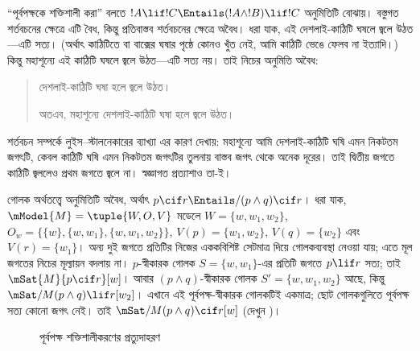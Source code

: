 \documentclass[../../../include/open-logic-section]{subfiles}
\begin{document}


``পূর্বপক্ষকে শক্তিশালী করা'' বলতে
$!A \lif !C \Entails (!A \land !B) \lif !C$ অনুমিতিটি বোঝায়।
বস্তুগত শর্তবচনের ক্ষেত্রে এটি বৈধ, কিন্তু প্রতিবাস্তব
শর্তবচনের ক্ষেত্রে অবৈধ। ধরা যাক, এই দেশলাই-কাঠিটি
ঘষলে জ্বলে উঠত—এটি সত্য। (অর্থাৎ কাঠিটিতে বা বাক্সের
ঘষার পৃষ্ঠে কোনও খুঁত নেই, আমি কাঠিটি ভেঙে ফেলব না
ইত্যাদি।) কিন্তু মহাশূন্যে এই কাঠিটি ঘষলে জ্বলে উঠত—এটি
সত্য নয়। তাই নিচের অনুমিতি অবৈধ:
\begin{quote}
  দেশলাই-কাঠিটি ঘষা হলে জ্বলে উঠত।

  অতএব, মহাশূন্যে দেশলাই-কাঠিটি ঘষা হলে জ্বলে উঠত।
\end{quote}

শর্তবচন সম্পর্কে লুইস--স্টালনেকারের ব্যাখ্যা এর কারণ দেখায়:
মহাশূন্যে আমি দেশলাই-কাঠিটি ঘষি এমন নিকটতম জগৎটি,
কেবল কাঠিটি ঘষি এমন নিকটতম জগৎটির তুলনায় বাস্তব জগৎ
থেকে অনেক দূরের। তাই দ্বিতীয় জগতে কাঠিটি জ্বললেও
প্রথম জগতে জ্বলে না। স্বজ্ঞাগত প্রত্যাশাও তা-ই।

\begin{ex}
  গোলক অর্থতত্ত্বে অনুমিতিটি অবৈধ, অর্থাৎ $p
  \cif r \Entails/ (p \land q) \cif r$। ধরা যাক,
  $\mModel{M} = \tuple{W, O, V}$ মডেলে
  $W = \{w, w_1, w_2\}$,
  $O_w = \{\{w\}, \{w, w_1\}, \{w, w_1, w_2\}\}$,
  $V(p) = \{w_1, w_2\}$, $V(q) = \{w_2\}$
  এবং $V(r) = \{w_1\}$।
  অন্য দুই জগতে প্রতিটির নিজের এককবিশিষ্ট সেটমাত্র দিয়ে
  গোলকব্যবস্থা নেওয়া যায়; এতে মূল জগতের নিচের মূল্যায়ন বদলায় না।
  $p$-স্বীকারক গোলক
  $S = \{w, w_1\}$-এর প্রতিটি জগতে $p \lif r$ সত্য;
  তাই $\mSat{M}{p \cif r}[w]$। আবার $(p \land q)$-স্বীকারক
  গোলক $S' = \{w, w_1, w_2\}$ আছে, কিন্তু
  $\mSat/{M}{(p \land q) \lif r}[w_2]$। এখানে এই
  পূর্বপক্ষ-স্বীকারক গোলকটিই একমাত্র; ছোট গোলকগুলিতে পূর্বপক্ষ
  সত্য কোনো জগৎ নেই। তাই
  $\mSat/{M}{(p \land q) \cif r}[w]$
  (দেখুন )।

\begin{figure}
\begin{center}
\caption{পূর্বপক্ষ শক্তিশালীকরণের প্রত্যুদাহরণ}
\end{center}
\end{figure}
\end{ex}
\end{document}

